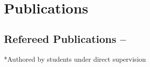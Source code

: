 \section{Publications}

\subsection{Refereed Publications -- \href{https://ui.adsabs.harvard.edu/search/filter_database_fq_database=OR&filter_database_fq_database=database\%3A\%22astronomy\%22&fq=\%7B!type\%3Daqp\%20v\%3D\%24fq_database\%7D&fq_database=(database\%3A\%22astronomy\%22)&q=\%3Dauthor\%3A(\%22Kim\%2C\%20Jeong-Gyu\%22)&sort=date\%20desc\%2C\%20bibcode\%20desc}{\color{dodgerblue}{ADS
Search}}}

*Authored by students under direct supervision


